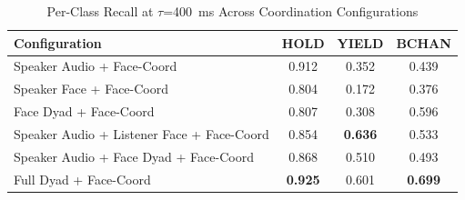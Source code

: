\begin{table}[h]
\caption{Per-Class Recall at $\tau$=400~ms Across Coordination Configurations}
\label{tab:recall_per_class_coordination}
\small
\renewcommand{\arraystretch}{1.20}
\begin{tabular}{>{\raggedright\arraybackslash}p{4cm}ccc}
\toprule
Configuration & HOLD & YIELD & BCHAN \\
\midrule
Speaker Audio + Face-Coord & 0.912 & 0.352 & 0.439 \\
Speaker Face + Face-Coord & 0.804 & 0.172 & 0.376 \\
Face Dyad + Face-Coord & 0.807 & 0.308 & 0.596 \\
Speaker Audio + Listener Face + Face-Coord & 0.854 & \textbf{0.636} & 0.533 \\
Speaker Audio + Face Dyad + Face-Coord & 0.868 & 0.510 & 0.493 \\
Full Dyad + Face-Coord & \textbf{0.925} & 0.601 & \textbf{0.699} \\
\bottomrule
\end{tabular}
\end{table}
